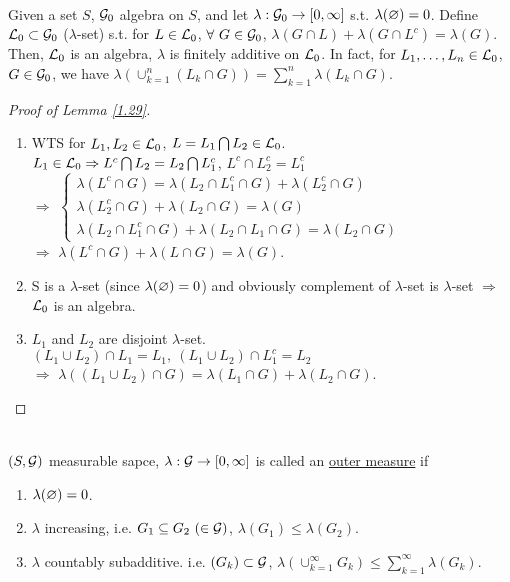 \begin{lemma}\label{1.29}\ \\
Given a set $S$, $\mathcal{G}_0$ algebra on $S$, and let $\lambda: \mathcal{G}_0 \to [0,\infty]$ s.t. $\lambda(\varnothing) = 0$. Define $\mathcal{L}_0 \subset \mathcal{G}_0$ ($\lambda$-set) s.t. for $L \in \mathcal{L}_0$, $\forall\ G \in \mathcal{G}_0$, $\lambda(G \cap L) + \lambda (G \cap L^c) = \lambda(G)$.  Then, $\mathcal{L}_0$ is an algebra, $\lambda$ is finitely additive on $\mathcal{L}_0$. In fact, for $L_1,\dots,L_n \in \mathcal{L}_0$, $G \in \mathcal{G}_0$, we have $\lambda (\cup_{k=1}^n (L_k \cap G)) = \sum_{k = 1}^n \lambda(L_k \cap G)$.
\end{lemma}
\begin{proof}[Proof of Lemma \ref{1.29}]\ 
\begin{enumerate}[label = (\alph*)]
    \item WTS for $L_1,L_2 \in \mathcal{L}_0$, $L = L_1 \bigcap L_2 \in \mathcal{L}_0$.\\
    $L_1 \in \mathcal{L}_0 \Rightarrow L^c \bigcap L_2 = L_2 \bigcap L_1^c$, $L^c \cap L_2^c = L_1^c$\\ 
    $\Rightarrow$ $\left\{\begin{matrix}
\lambda(L^c \cap G) = \lambda (L_2 \cap L_1^c \cap G) + \lambda (L_2^c \cap G)\\ 
\lambda (L_2^c \cap G) + \lambda (L_2 \cap G) = \lambda (G)\\ 
\lambda (L_2 \cap L_1^c \cap G) + \lambda (L_2 \cap L_1 \cap G) = \lambda (L_2 \cap G)
\end{matrix}\right.$\\
    $\Rightarrow$ $\lambda(L^c \cap G) + \lambda(L \cap G) = \lambda(G)$.
    \item S is a $\lambda$-set (since $\lambda(\varnothing) = 0$) and obviously complement of $\lambda$-set is $\lambda$-set $\Rightarrow$ $\mathcal{L}_0$ is an algebra.
    \item $L_1$ and $L_2$ are disjoint $\lambda$-set.\\
    $(L_1 \cup L_2) \cap L_1 = L_1,\ (L_1 \cup L_2) \cap L_1^c = L_2$\\
    $\Rightarrow$ $\lambda((L_1 \cup L_2) \cap G) = \lambda (L_1 \cap G) + \lambda(L_2 \cap G)$.
\end{enumerate}
\end{proof}
\begin{definition}\ \\
$(S, \mathcal{G})$ measurable sapce, $\lambda: \mathcal{G} \to [0,\infty]$ is called an \underline{outer measure} if
\begin{enumerate}[label = (\alph*)]
    \item $\lambda(\varnothing) = 0$.
    \item $\lambda$ increasing, i.e. $G_1 \subseteq G_2\ (\in \mathcal{G})$, $\lambda(G_1) \leq \lambda(G_2)$.
    \item $\lambda$ countably subadditive. i.e. $(G_k) \subset \mathcal{G}$, $\lambda (\cup_{k = 1}^\infty G_k) \leq \sum_{k=1}^\infty \lambda(G_k)$.
\end{enumerate}
\end{definition}
